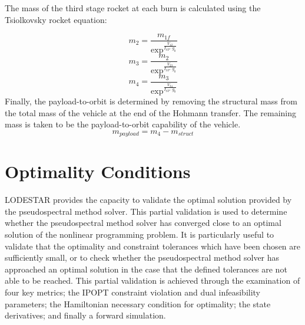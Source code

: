 The mass of the third stage rocket at each burn is calculated using the Tsiolkovsky rocket equation:

\begin{equation}
m_2 = \frac{m_{1f}}{\exp^{\frac{V_{12}}{I_{SP} \cdot g_0}}}
\end{equation}
\begin{equation}
m_3 = \frac{m_{2}}{\exp^{\frac{V_{23}}{I_{SP} \cdot g_0}}}
\end{equation}
\begin{equation}
m_4 = \frac{m_{3}}{\exp^{\frac{V_{34}}{I_{SP} \cdot g_0}}}
\end{equation}
Finally, the payload-to-orbit is determined by removing the structural mass from the total mass of the vehicle at the end of the Hohmann transfer. The remaining mass is taken to be the payload-to-orbit capability of the vehicle.
\begin{equation}
m_{payload} = m_4 - m_{struct}
\end{equation}



\section{Optimality Conditions}

LODESTAR provides the capacity to validate the optimal solution provided by the pseudospectral method solver. This partial validation is used to determine whether the pseudospectral method solver has converged close to an optimal solution of the nonlinear programming problem. It is particularly useful to validate that the optimality and constraint tolerances which have been chosen are sufficiently small, or to check whether the pseudospectral method solver has approached an optimal solution in the case that the defined tolerances are not able to be reached.   
This partial validation is achieved through the examination of four key metrics; the IPOPT constraint violation and dual infeasibility parameters; the Hamiltonian necessary condition for optimality; the state derivatives; and finally a forward simulation. 

